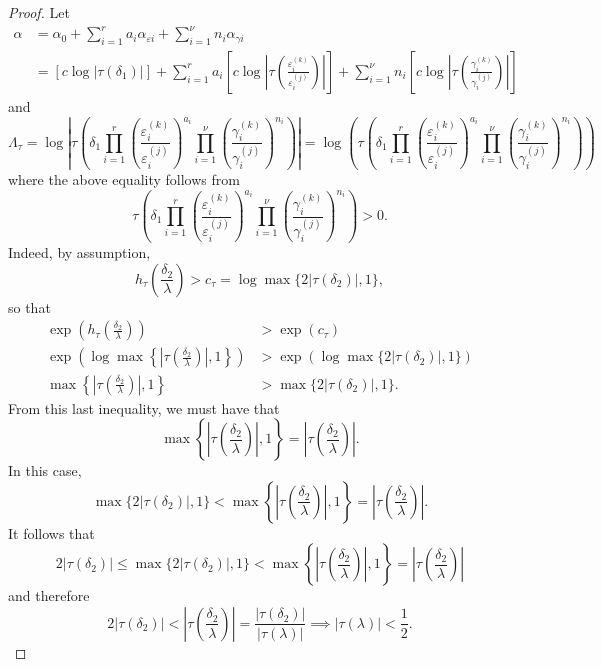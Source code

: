 \begin{proof}
Let 
\begin{align*}
\alpha	
	& = \alpha_0+\sum_{i = 1}^r a_i \alpha_{\varepsilon i} + \sum_{i = 1}^{\nu} n_i \alpha_{\gamma i}\\
	& = [c\log|\tau(\delta_1)|] +\sum_{i = 1}^r a_i \left[c\log\left|\tau\left(\frac{\varepsilon_i^{(k)}}{\varepsilon_i^{(j)}}\right)\right|\right] + \sum_{i = 1}^{\nu} n_i \left[c\log\left|\tau\left(\frac{\gamma_i^{(k)}}{\gamma_i^{(j)}}\right)\right|\right]
\end{align*}
and
\[\Lambda_{\tau} = \log\left|\tau\left(\delta_1 \prod_{i = 1}^r\left( \frac{\varepsilon_i^{(k)}}{\varepsilon_i^{(j)}}\right)^{a_i}\prod_{i = 1}^{\nu} \left( \frac{\gamma_i^{(k)}}{\gamma_i^{(j)}}\right)^{n_i}\right)\right|= \log\left(\tau\left(\delta_1 \prod_{i = 1}^r\left( \frac{\varepsilon_i^{(k)}}{\varepsilon_i^{(j)}}\right)^{a_i}\prod_{i = 1}^{\nu} \left( \frac{\gamma_i^{(k)}}{\gamma_i^{(j)}}\right)^{n_i}\right)\right) \]
where the above equality follows from 
\[\tau\left(\delta_1 \prod_{i = 1}^r\left( \frac{\varepsilon_i^{(k)}}{\varepsilon_i^{(j)}}\right)^{a_i}\prod_{i = 1}^{\nu} \left( \frac{\gamma_i^{(k)}}{\gamma_i^{(j)}}\right)^{n_i}\right) > 0.\]
Indeed, by assumption,
\[ h_{\tau}\left(\frac{\delta_2}{\lambda}\right) > c_\tau = \log \max\{2|\tau(\delta_2)|,1\},\]
so that 
\begin{align*}
\exp\left(h_{\tau}\left(\frac{\delta_2}{\lambda}\right)\right)	& > \exp(c_{\tau}) \\
\exp\left(\log \max \left\{ \left|\tau\left(\frac{\delta_2}{\lambda}\right)\right|, 1\right\}\right) & > \exp \left(\log \max\{2|\tau(\delta_2)|,1\}\right)\\
\max \left\{ \left|\tau\left(\frac{\delta_2}{\lambda}\right)\right|, 1\right\} & > \max\{2|\tau(\delta_2)|,1\}.
\end{align*}
From this last inequality, we must have that 
\[\max \left\{ \left|\tau\left(\frac{\delta_2}{\lambda}\right)\right|, 1\right\} = \left|\tau\left(\frac{\delta_2}{\lambda}\right)\right|.\]
In this case, 
\[\max\{2|\tau(\delta_2)|,1\} < \max \left\{ \left|\tau\left(\frac{\delta_2}{\lambda}\right)\right|, 1\right\} = \left|\tau\left(\frac{\delta_2}{\lambda}\right)\right|.\]
It follows that
\[2|\tau(\delta_2)| \leq \max\{2|\tau(\delta_2)|,1\} < \max \left\{ \left|\tau\left(\frac{\delta_2}{\lambda}\right)\right|, 1\right\} = \left|\tau\left(\frac{\delta_2}{\lambda}\right)\right|\]
and therefore
\[2|\tau(\delta_2)| < \left|\tau\left(\frac{\delta_2}{\lambda}\right)\right| = \frac{|\tau(\delta_2)|}{|\tau(\lambda)|} \implies |\tau(\lambda)| < \frac{1}{2}.\]

\end{proof}
